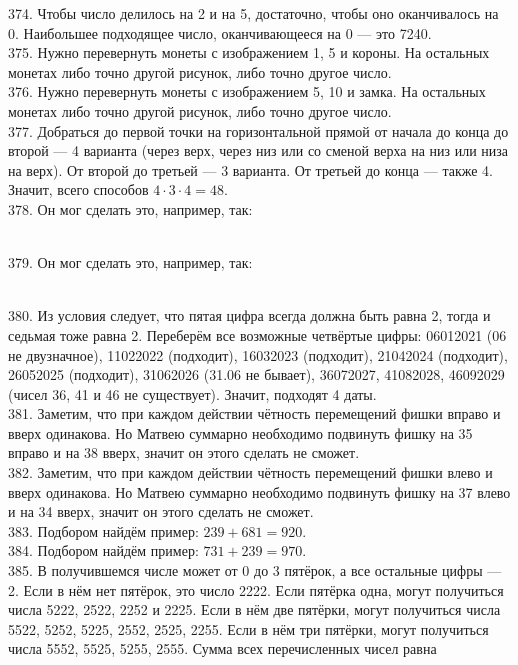 374. Чтобы число делилось на 2 и на 5, достаточно, чтобы оно оканчивалось на 0. Наибольшее подходящее число, оканчивающееся на 0 --- это 7240.\\
375. Нужно перевернуть монеты с изображением 1, 5 и короны. На остальных монетах либо точно другой рисунок, либо точно другое число.\\
376. Нужно перевернуть монеты с изображением 5, 10 и замка. На остальных монетах либо точно другой рисунок, либо точно другое число.\\
377. Добраться до первой точки на горизонтальной прямой от начала до конца до второй --- 4 варианта (через верх, через низ или со сменой верха на низ или низа на верх). От второй до третьей --- 3 варианта. От третьей до конца --- также 4. Значит, всего способов $4\cdot3\cdot4=48.$\\
378. Он мог сделать это, например, так:
\begin{figure}[ht!]
\end{figure}\\
379. Он мог сделать это, например, так:
\begin{figure}[ht!]
\end{figure}\\
380. Из условия следует, что пятая цифра всегда должна быть равна 2, тогда и седьмая тоже равна 2. Переберём все возможные четвёртые цифры: 06012021 (06 не двузначное), 11022022 (подходит), 16032023 (подходит), 21042024 (подходит), 26052025 (подходит), 31062026 (31.06 не бывает), 36072027, 41082028, 46092029 (чисел 36, 41 и 46 не существует). Значит, подходят 4 даты.\\
381. Заметим, что при каждом действии чётность перемещений фишки вправо и вверх одинакова. Но Матвею суммарно необходимо подвинуть фишку на 35 вправо и на 38 вверх, значит он этого сделать не сможет.\\
382. Заметим, что при каждом действии чётность перемещений фишки влево и вверх одинакова. Но Матвею суммарно необходимо подвинуть фишку на 37 влево и на 34 вверх, значит он этого сделать не сможет.\\
383. Подбором найдём пример: $239+681=920.$\\
384. Подбором найдём пример: $731+239=970.$\\
385. В получившемся числе может от 0 до 3 пятёрок, а все остальные цифры --- 2. Если в нём нет пятёрок, это число 2222. Если пятёрка одна, могут получиться числа 5222, 2522, 2252 и 2225. Если в нём две пятёрки, могут получиться числа 5522, 5252, 5225, 2552, 2525, 2255. Если в нём три пятёрки, могут получиться числа 5552, 5525, 5255, 2555. Сумма всех перечисленных чисел равна
